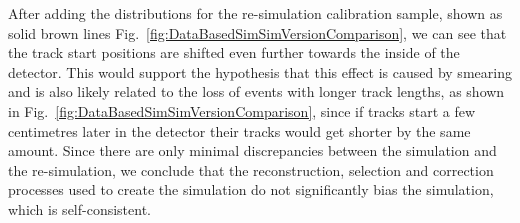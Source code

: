 
After adding the distributions for the re-simulation calibration sample, shown as solid brown lines Fig.~\ref{fig:DataBasedSimSimVersionComparison}, we can see that the track start positions are shifted even further towards the inside of the detector. This would support the hypothesis that this effect is caused by smearing and is also likely related to the loss of events with longer track lengths, as shown in Fig.~\ref{fig:DataBasedSimSimVersionComparison}, since if tracks start a few centimetres later in the detector their tracks would get shorter by the same amount. Since there are only minimal discrepancies between the simulation and the re-simulation, we conclude that the reconstruction, selection and correction processes used to create the simulation do not significantly bias the simulation, which is self-consistent.

